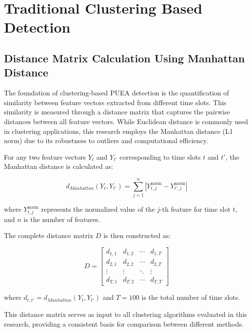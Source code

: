 \chapter{Traditional Clustering Based Detection}

\section{Distance Matrix Calculation Using Manhattan Distance}

The foundation of clustering-based PUEA detection is the quantification of similarity between feature vectors extracted from different time slots. This similarity is measured through a distance matrix that captures the pairwise distances between all feature vectors. While Euclidean distance is commonly used in clustering applications, this research employs the Manhattan distance (L1 norm) due to its robustness to outliers and computational efficiency.

For any two feature vectors $Y_t$ and $Y_{t'}$ corresponding to time slots $t$ and $t'$, the Manhattan distance is calculated as:

\begin{equation}
    d_{Manhattan}(Y_t, Y_{t'}) = \sum_{j=1}^{n} |Y_{t,j}^{\text{norm}} - Y_{t',j}^{\text{norm}}|
\end{equation}

where $Y_{t,j}^{\text{norm}}$ represents the normalized value of the $j$-th feature for time slot $t$, and $n$ is the number of features.

The complete distance matrix $D$ is then constructed as:

\begin{equation}
    D = \begin{bmatrix}
        d_{1,1} & d_{1,2} & \cdots & d_{1,T} \\
        d_{2,1} & d_{2,2} & \cdots & d_{2,T} \\
        \vdots & \vdots & \ddots & \vdots \\
        d_{T,1} & d_{T,2} & \cdots & d_{T,T}
    \end{bmatrix}
\end{equation}

where $d_{t,t'} = d_{Manhattan}(Y_t, Y_{t'})$ and $T = 100$ is the total number of time slots.

This distance matrix serves as input to all clustering algorithms evaluated in this research, providing a consistent basis for comparison between different methods.

